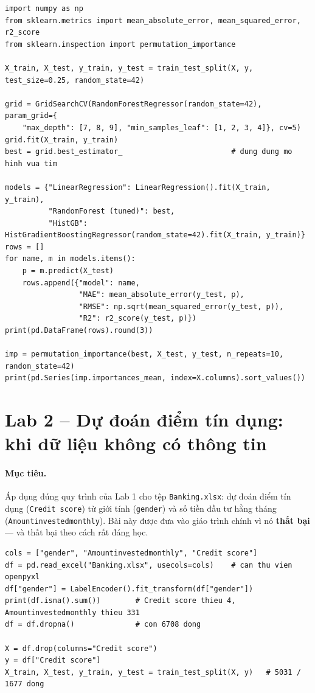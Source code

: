 \begin{lstlisting}[caption={Lab 1 -- phiên bản đã sửa: tái lập được, dùng đúng tham số, đủ ba độ đo}]
import numpy as np
from sklearn.metrics import mean_absolute_error, mean_squared_error, r2_score
from sklearn.inspection import permutation_importance

X_train, X_test, y_train, y_test = train_test_split(X, y, test_size=0.25, random_state=42)

grid = GridSearchCV(RandomForestRegressor(random_state=42), param_grid={
    "max_depth": [7, 8, 9], "min_samples_leaf": [1, 2, 3, 4]}, cv=5)
grid.fit(X_train, y_train)
best = grid.best_estimator_                         # dung dung mo hinh vua tim

models = {"LinearRegression": LinearRegression().fit(X_train, y_train),
          "RandomForest (tuned)": best,
          "HistGB": HistGradientBoostingRegressor(random_state=42).fit(X_train, y_train)}
rows = []
for name, m in models.items():
    p = m.predict(X_test)
    rows.append({"model": name,
                 "MAE": mean_absolute_error(y_test, p),
                 "RMSE": np.sqrt(mean_squared_error(y_test, p)),
                 "R2": r2_score(y_test, p)})
print(pd.DataFrame(rows).round(3))

imp = permutation_importance(best, X_test, y_test, n_repeats=10, random_state=42)
print(pd.Series(imp.importances_mean, index=X.columns).sort_values())
\end{lstlisting}

\section{Lab 2 -- Dự đoán điểm tín dụng: khi dữ liệu không có thông tin}
\label{sec:lab-bank}

\paragraph{Mục tiêu.} Áp dụng đúng quy trình của Lab 1 cho tệp \texttt{Banking.xlsx}: dự đoán điểm tín dụng (\texttt{Credit score}) từ giới tính (\texttt{gender}) và số tiền đầu tư hằng tháng (\texttt{Amountinvestedmonthly}). Bài này được đưa vào giáo trình chính vì nó \textbf{thất bại} --- và thất bại theo cách rất đáng học.

\begin{lstlisting}[caption={Lab 2 -- đọc dữ liệu từ Excel và chạy cùng quy trình}]
cols = ["gender", "Amountinvestedmonthly", "Credit score"]
df = pd.read_excel("Banking.xlsx", usecols=cols)    # can thu vien openpyxl
df["gender"] = LabelEncoder().fit_transform(df["gender"])
print(df.isna().sum())        # Credit score thieu 4, Amountinvestedmonthly thieu 331
df = df.dropna()              # con 6708 dong

X = df.drop(columns="Credit score")
y = df["Credit score"]
X_train, X_test, y_train, y_test = train_test_split(X, y)   # 5031 / 1677 dong
\end{lstlisting}

